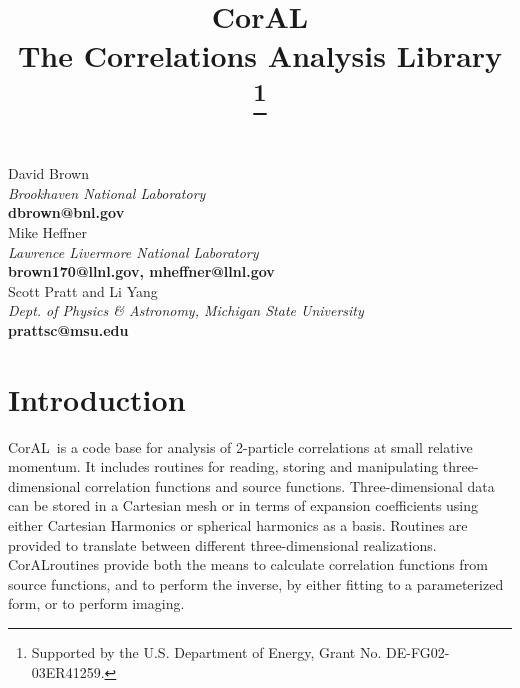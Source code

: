 \documentclass[10pt]{article}
\newcommand{\coral}{CorAL}
\begin{document}
\title{\coral\\
\Large \bf The Correlations Analysis Library
\thanks{Supported by the U.S. Department of Energy, Grant No.  DE-FG02-03ER41259.}
}

\maketitle

\begin{center}
David Brown\\
{\it Brookhaven National Laboratory}\\
{\small \bf dbrown@bnl.gov}\\
Mike Heffner\\
{\it Lawrence Livermore National Laboratory}\\
{\small \bf brown170@llnl.gov, mheffner@llnl.gov}\\
\vspace*{8pt}
Scott Pratt and Li Yang\\
{\it Dept. of Physics \& Astronomy, Michigan State University}\\
{\small\bf prattsc@msu.edu}

\end{center}

\vspace*{0.4in}

\tableofcontents

\newpage

\section{Introduction}

\coral\ is a code base for analysis of 2-particle correlations at small relative momentum. It includes routines for reading, storing and manipulating three-dimensional correlation functions and source functions. Three-dimensional data can be stored in a Cartesian mesh or in terms of expansion coefficients using either Cartesian Harmonics or spherical harmonics as a basis. Routines are provided to translate between different three-dimensional realizations. \coral routines provide both the means to calculate correlation functions from source functions, and to perform the inverse, by either fitting to a parameterized form, or to perform imaging.
\end{document}
